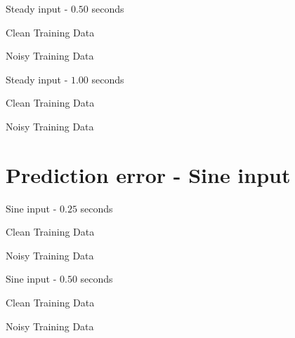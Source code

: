 \documentclass{beamer}
\begin{document}
\begin{frame}{Steady input - $0.50$ seconds}
    \scriptsize
    \begin{table}[!ht]
        \centering
        \caption{Clean Training Data}
    \end{table}

    \begin{table}[!ht]
        \centering
        \caption{Noisy Training Data}
    \end{table}
\end{frame}

\begin{frame}{Steady input - $1.00$ seconds}
    \scriptsize
    \begin{table}[!ht]
        \centering
        \caption{Clean Training Data}
    \end{table}

    \begin{table}[!ht]
        \centering
        \caption{Noisy Training Data}
    \end{table}
\end{frame}


\section{Prediction error - Sine input}

\begin{frame}{Sine input - $0.25$ seconds}
    \scriptsize
    \begin{table}[!ht]
        \centering
        \caption{Clean Training Data}
    \end{table}

    \begin{table}[!ht]
        \centering
        \caption{Noisy Training Data}
    \end{table}
\end{frame}

\begin{frame}{Sine input - $0.50$ seconds}
    \scriptsize
    \begin{table}[!ht]
        \centering
        \caption{Clean Training Data}
    \end{table}

    \begin{table}[!ht]
        \centering
        \caption{Noisy Training Data}
    \end{table}
\end{frame}
\end{document}

